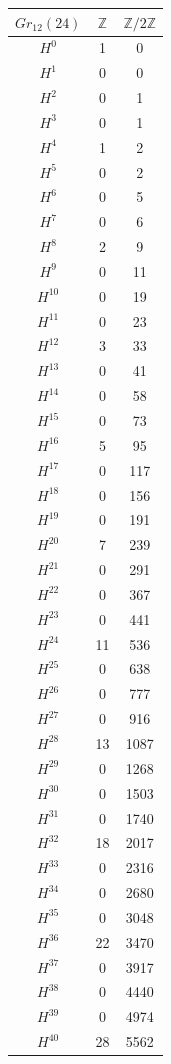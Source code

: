 \centering
\begin{tabular}{|c|c|c|}
\hline
$Gr_{12}(24)$&$\mathbb{Z}$&$\mathbb{Z}/2\mathbb{Z}$\\ \hline
$H^{0}$&1&0\\\hline
$H^{1}$&0&0\\\hline
$H^{2}$&0&1\\\hline
$H^{3}$&0&1\\\hline
$H^{4}$&1&2\\\hline
$H^{5}$&0&2\\\hline
$H^{6}$&0&5\\\hline
$H^{7}$&0&6\\\hline
$H^{8}$&2&9\\\hline
$H^{9}$&0&11\\\hline
$H^{10}$&0&19\\\hline
$H^{11}$&0&23\\\hline
$H^{12}$&3&33\\\hline
$H^{13}$&0&41\\\hline
$H^{14}$&0&58\\\hline
$H^{15}$&0&73\\\hline
$H^{16}$&5&95\\\hline
$H^{17}$&0&117\\\hline
$H^{18}$&0&156\\\hline
$H^{19}$&0&191\\\hline
$H^{20}$&7&239\\\hline
$H^{21}$&0&291\\\hline
$H^{22}$&0&367\\\hline
$H^{23}$&0&441\\\hline
$H^{24}$&11&536\\\hline
$H^{25}$&0&638\\\hline
$H^{26}$&0&777\\\hline
$H^{27}$&0&916\\\hline
$H^{28}$&13&1087\\\hline
$H^{29}$&0&1268\\\hline
$H^{30}$&0&1503\\\hline
$H^{31}$&0&1740\\\hline
$H^{32}$&18&2017\\\hline
$H^{33}$&0&2316\\\hline
$H^{34}$&0&2680\\\hline
$H^{35}$&0&3048\\\hline
$H^{36}$&22&3470\\\hline
$H^{37}$&0&3917\\\hline
$H^{38}$&0&4440\\\hline
$H^{39}$&0&4974\\\hline
$H^{40}$&28&5562\\\hline
\end{tabular}
